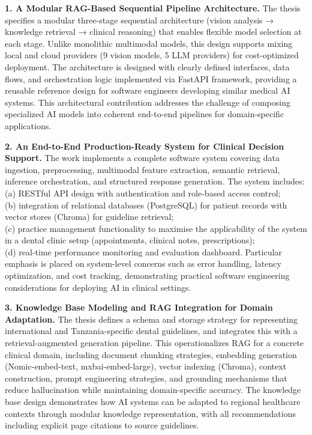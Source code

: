\documentclass[12pt,a4paper]{report}
\begin{document}
	\textbf{1. A Modular RAG-Based Sequential Pipeline Architecture.}
	The thesis specifies a modular three-stage sequential architecture (vision analysis → knowledge retrieval → clinical reasoning) that enables flexible model selection at each stage. Unlike monolithic multimodal models, this design supports mixing local and cloud providers (9 vision models, 5 LLM providers) for cost-optimized deployment. The architecture is designed with clearly defined interfaces, data flows, and orchestration logic implemented via FastAPI framework, providing a reusable reference design for software engineers developing similar medical AI systems. This architectural contribution addresses the challenge of composing specialized AI models into coherent end-to-end pipelines for domain-specific applications.
	
	\textbf{2. An End-to-End Production-Ready System for Clinical Decision Support.}
	The work implements a complete software system covering data ingestion, preprocessing, multimodal feature extraction, semantic retrieval, inference orchestration, and structured response generation. The system includes: \\
	(a) RESTful API design with authentication and role-based access control; \\
	(b) integration of relational databases (PostgreSQL) for patient records with vector stores (Chroma) for guideline retrieval; \\
	(c) practice management functionality to maximise the applicability of the system in a dental clinic setup (appointments, clinical notes, prescriptions); \\
	(d) real-time performance monitoring and evaluation dashboard. Particular emphasis is placed on system-level concerns such as error handling, latency optimization, and cost tracking, demonstrating practical software engineering considerations for deploying AI in clinical settings.
	
	\textbf{3. Knowledge Base Modeling and RAG Integration for Domain Adaptation.}
	The thesis defines a schema and storage strategy for representing international and Tanzania-specific dental guidelines, and integrates this with a retrieval-augmented generation pipeline. This operationalizes RAG for a concrete clinical domain, including document chunking strategies, embedding generation (Nomic-embed-text, mxbai-embed-large), vector indexing (Chroma), context construction, prompt engineering strategies, and grounding mechanisms that reduce hallucination while maintaining domain-specific accuracy. The knowledge base design demonstrates how AI systems can be adapted to regional healthcare contexts through modular knowledge representation, with all recommendations including explicit page citations to source guidelines.
	
\end{document}
